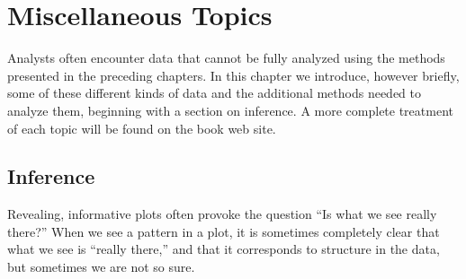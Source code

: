 \chapter{Miscellaneous Topics}


%
%
%
%
%
%



Analysts often encounter data that cannot be fully analyzed using
the methods presented in the preceding chapters. In this chapter we
introduce, however briefly, some of these different kinds of data and
the additional methods needed to analyze them, beginning with a
section on inference.  A more complete treatment of each topic will be
found on the book web site.

\section{Inference}

 Revealing, informative plots often provoke the
question ``Is what we see really there?''  When we see a pattern in a
plot, it is sometimes completely clear that what we see is ``really
there,'' and that it corresponds to structure in the data, but
sometimes we are not so sure.


